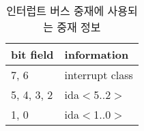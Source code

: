 %
%
\begin{table}[htbp]
\caption{인터럽트 버스 중재에 사용되는 중재 정보}\label{table:int-arb}
   \begin{center}
   \begin{tabular}{|l|l|} \hline
	bit field & information \\
\hline \hline
	7, 6       & interrupt class \\ \hline
	5, 4, 3, 2 & ida$<$5..2$>$ \\ \hline
	1, 0       & ida$<$1..0$>$ \\ \hline
   \end{tabular}
   \end{center}
\end{table}
%
%
